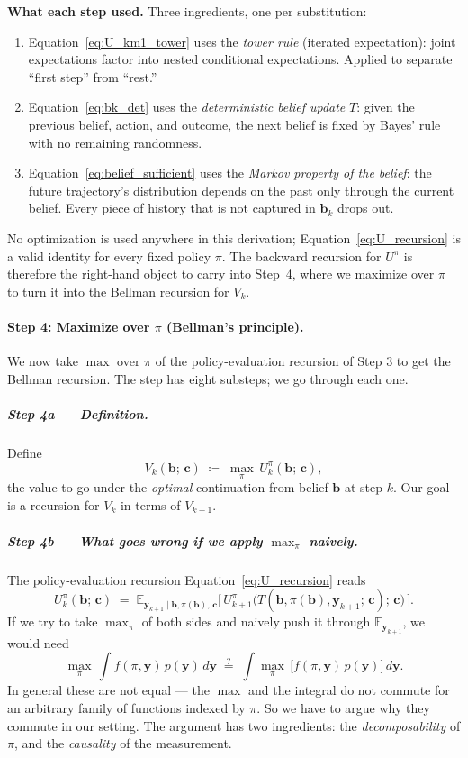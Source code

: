 \documentclass[11pt]{article}
\newcommand{\bc}{\bm{c}}
\newcommand{\by}{\bm{y}}
\newcommand{\bb}{\bm{b}}
\newcommand{\E}{\mathbb{E}}
\begin{document}
\textbf{What each step used.}  Three ingredients, one per substitution:
\begin{enumerate}[nosep, leftmargin=*]
\item Equation~\eqref{eq:U_km1_tower} uses the \emph{tower rule} (iterated expectation): joint expectations factor into nested conditional expectations.  Applied to separate ``first step'' from ``rest.''
\item Equation~\eqref{eq:bk_det} uses the \emph{deterministic belief update} $T$: given the previous belief, action, and outcome, the next belief is fixed by Bayes' rule with no remaining randomness.
\item Equation~\eqref{eq:belief_sufficient} uses the \emph{Markov property of the belief}: the future trajectory's distribution depends on the past only through the current belief.  Every piece of history that is not captured in $\bb_k$ drops out.
\end{enumerate}
No optimization is used anywhere in this derivation; Equation~\eqref{eq:U_recursion} is a valid identity for every fixed policy $\pi$.  The backward recursion for $U^\pi$ is therefore the right-hand object to carry into Step~4, where we maximize over $\pi$ to turn it into the Bellman recursion for $V_k$.

\paragraph{Step 4: Maximize over $\pi$ (Bellman's principle).}  We now take $\max$ over $\pi$ of the policy-evaluation recursion of Step 3 to get the Bellman recursion.  The step has eight substeps; we go through each one.

\subparagraph{Step 4a --- Definition.}  Define
\begin{equation}
V_k(\bb;\, \bc) \;\coloneqq\; \max_\pi\, U^\pi_k(\bb;\, \bc),
\label{eq:V_k_from_U}
\end{equation}
the value-to-go under the \emph{optimal} continuation from belief $\bb$ at step $k$.  Our goal is a recursion for $V_k$ in terms of $V_{k+1}$.

\subparagraph{Step 4b --- What goes wrong if we apply $\max_\pi$ naively.}  The policy-evaluation recursion Equation~\eqref{eq:U_recursion} reads
\begin{equation}
U^\pi_k(\bb;\, \bc) \;=\; \E_{\by_{k+1} \mid \bb, \pi(\bb),\, \bc}\!\bigl[\,U^\pi_{k+1}\bigl(T(\bb, \pi(\bb), \by_{k+1};\, \bc);\, \bc\bigr)\,\bigr].
\end{equation}
If we try to take $\max_\pi$ of both sides and naively push it through $\E_{\by_{k+1}}$, we would need
\begin{equation}
\max_\pi\, \int f(\pi, \by)\, p(\by)\, d\by \;\stackrel{?}{=}\; \int \max_\pi\, \bigl[f(\pi, \by)\, p(\by)\bigr]\, d\by.
\end{equation}
In general these are not equal --- the $\max$ and the integral do not commute for an arbitrary family of functions indexed by $\pi$.  So we have to argue why they commute in our setting.  The argument has two ingredients: the \emph{decomposability} of $\pi$, and the \emph{causality} of the measurement.
\end{document}
